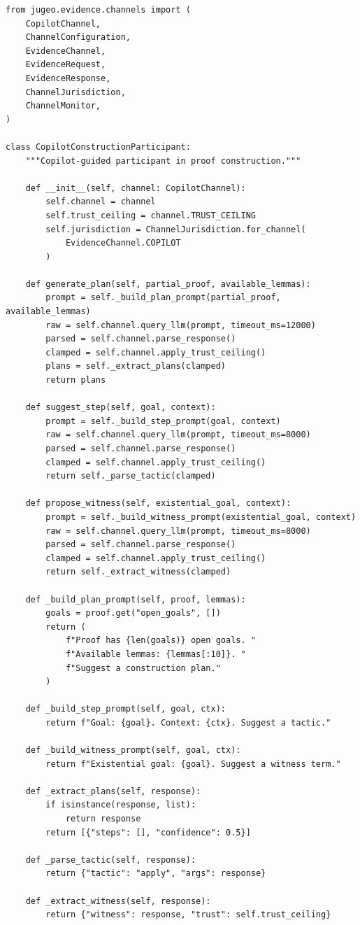 \documentclass[11pt]{article}
\begin{document}
\begin{lstlisting}[style=jugeo-python,
  caption={Construction plan generation via CopilotChannel},
  label={lst:conplan}]
from jugeo.evidence.channels import (
    CopilotChannel,
    ChannelConfiguration,
    EvidenceChannel,
    EvidenceRequest,
    EvidenceResponse,
    ChannelJurisdiction,
    ChannelMonitor,
)

class CopilotConstructionParticipant:
    """Copilot-guided participant in proof construction."""

    def __init__(self, channel: CopilotChannel):
        self.channel = channel
        self.trust_ceiling = channel.TRUST_CEILING
        self.jurisdiction = ChannelJurisdiction.for_channel(
            EvidenceChannel.COPILOT
        )

    def generate_plan(self, partial_proof, available_lemmas):
        prompt = self._build_plan_prompt(partial_proof, available_lemmas)
        raw = self.channel.query_llm(prompt, timeout_ms=12000)
        parsed = self.channel.parse_response()
        clamped = self.channel.apply_trust_ceiling()
        plans = self._extract_plans(clamped)
        return plans

    def suggest_step(self, goal, context):
        prompt = self._build_step_prompt(goal, context)
        raw = self.channel.query_llm(prompt, timeout_ms=8000)
        parsed = self.channel.parse_response()
        clamped = self.channel.apply_trust_ceiling()
        return self._parse_tactic(clamped)

    def propose_witness(self, existential_goal, context):
        prompt = self._build_witness_prompt(existential_goal, context)
        raw = self.channel.query_llm(prompt, timeout_ms=8000)
        parsed = self.channel.parse_response()
        clamped = self.channel.apply_trust_ceiling()
        return self._extract_witness(clamped)

    def _build_plan_prompt(self, proof, lemmas):
        goals = proof.get("open_goals", [])
        return (
            f"Proof has {len(goals)} open goals. "
            f"Available lemmas: {lemmas[:10]}. "
            f"Suggest a construction plan."
        )

    def _build_step_prompt(self, goal, ctx):
        return f"Goal: {goal}. Context: {ctx}. Suggest a tactic."

    def _build_witness_prompt(self, goal, ctx):
        return f"Existential goal: {goal}. Suggest a witness term."

    def _extract_plans(self, response):
        if isinstance(response, list):
            return response
        return [{"steps": [], "confidence": 0.5}]

    def _parse_tactic(self, response):
        return {"tactic": "apply", "args": response}

    def _extract_witness(self, response):
        return {"witness": response, "trust": self.trust_ceiling}
\end{lstlisting}
\end{document}
